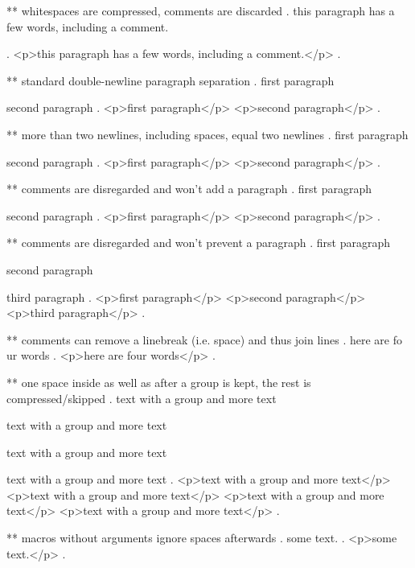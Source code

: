 ** whitespaces are compressed, comments are discarded
.
   this     paragraph  has a    few 
 words,   including
 a comment.


 
.
<p>this paragraph has a few words, including a comment.</p>
.


** standard double-newline paragraph separation
.
first paragraph

second paragraph
.
<p>first paragraph</p>
<p>second paragraph</p>
.



** more than two newlines, including spaces, equal two newlines
.
first paragraph

   
  


second paragraph
.
<p>first paragraph</p>
<p>second paragraph</p>
.


** comments are disregarded and won't add a paragraph
.
first paragraph




second paragraph
.
<p>first paragraph</p>
<p>second paragraph</p>
.

** comments are disregarded and won't prevent a paragraph
.
first paragraph %

second paragraph%

third paragraph
.
<p>first paragraph</p>
<p>second paragraph</p>
<p>third paragraph</p>
.


** comments can remove a linebreak (i.e. space) and thus join lines
.
here are fo%
ur words
.
<p>here are four words</p>
.


** one space inside as well as after a group is kept, the rest is compressed/skipped
.
text with {a group} and more text

text with { a group } and more text

text with { a group  } and more text

text with {  a group  }  and more text
.
<p>text with a group and more text</p>
<p>text with  a group  and more text</p>
<p>text with  a group  and more text</p>
<p>text with  a group  and more text</p>
.

** macros without arguments ignore spaces afterwards
.
some \echo  text.
.
<p>some text.</p>
.
